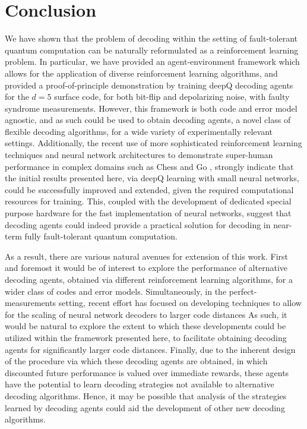 \documentclass[twocolumn,preprintnumbers,amsmath,amssymb,notitlepage,nofootinbib,longbibliography,superscriptaddress,aps,pra,10pt]{revtex4-1}
\begin{document}
\section{Conclusion}\label{s:conclusions}

	We have shown that the problem of decoding within the setting of fault-tolerant quantum computation can be naturally reformulated as a reinforcement learning problem.
	In particular, we have provided an agent-environment framework which allows for the application of diverse reinforcement learning algorithms, and provided a proof-of-principle demonstration by training deepQ decoding agents for the $d=5$ surface code, for both bit-flip and depolarizing noise, with faulty syndrome measurements.
	However, this framework is both code and error model agnostic, and as such could be used to obtain decoding agents, a novel class of flexible decoding algorithms, for a wide variety of experimentally relevant settings.
	Additionally, the recent use of more sophisticated reinforcement learning techniques and neural network architectures to demonstrate super-human performance in complex domains such as Chess and Go \cite{RLSilver17b,RLsilver2017mastering,RLSilver2016}, strongly indicate that the initial results presented here, via deepQ learning with small neural networks, could be successfully improved and extended, given the required computational resources for training.
	This, coupled with the development of dedicated special purpose hardware for the fast implementation of neural networks, suggest that decoding agents could indeed provide a practical solution for decoding in near-term fully fault-tolerant quantum computation.

	As a result, there are various natural avenues for extension of this work. 
	First and foremost it would be of interest to explore the performance of alternative decoding agents, obtained via different reinforcement learning algorithms, for a wider class of codes and error models.
	Simultaneously, in the perfect-measurements setting, recent effort has focused on developing techniques to allow for the scaling of neural network decoders to larger code distances \cite{Ni18}
	As such, it would be natural to explore the extent to which these developments could be utilized within the framework presented here, to facilitate obtaining decoding agents for significantly larger code distances.
	Finally, due to the inherent design of the procedure via which these decoding agents are obtained, in which discounted future performance is valued over immediate rewards, these agents have the potential to learn decoding strategies not available to alternative decoding algorithms.
	Hence, it may be possible that analysis of the strategies learned by decoding agents could aid the development of other new decoding algorithms.
	
\end{document}
